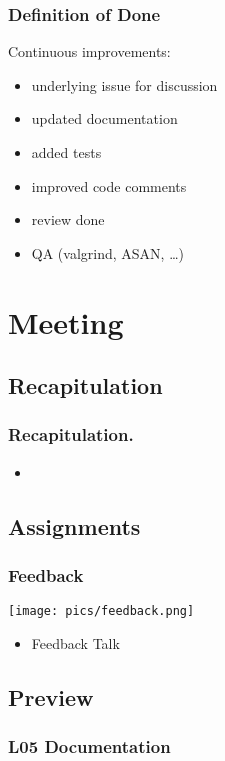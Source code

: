 \begin{frame}
	\frametitle{Definition of Done}

	Continuous improvements:

	\begin{itemize}
	\item underlying issue for discussion
	\item updated documentation
	\item added tests
	\item improved code comments
	\item review done
	\item QA (valgrind, ASAN, \dots)
	\end{itemize}
\end{frame}


\section{Meeting}

\subsection{Recapitulation}

\begin{frame}
	\frametitle{Recapitulation.}
	\begin{itemize}
		\item 
	\end{itemize}
\end{frame}

\subsection{Assignments}

\begin{frame}
	\frametitle{Feedback}

	\hfill \texttt{[image: pics/feedback.png]}
	\vspace{-1cm}
	\begin{itemize}
		\item Feedback Talk
	\end{itemize}
\end{frame}

\subsection{Preview}

\begin{frame}
	\frametitle{L05 Documentation}
\end{frame}



